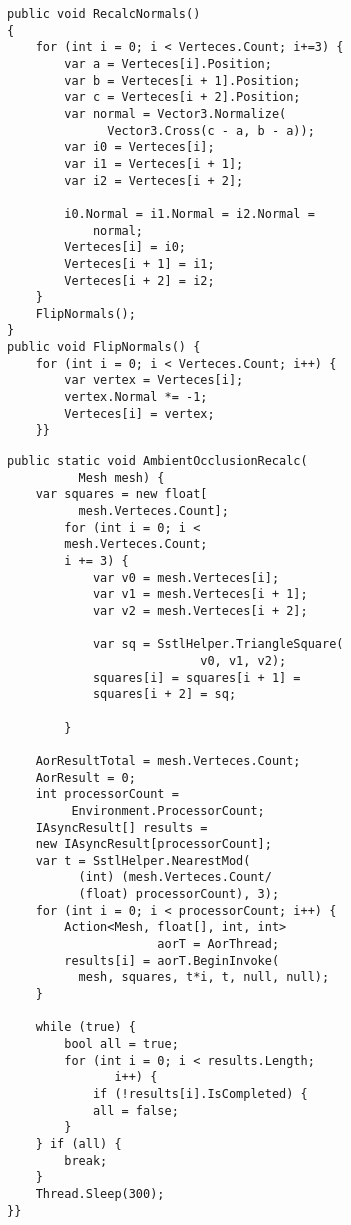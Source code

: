 \clearpage
{}
\begin{lstlisting}
public void RecalcNormals()
{
    for (int i = 0; i < Verteces.Count; i+=3) {
        var a = Verteces[i].Position;
        var b = Verteces[i + 1].Position;
        var c = Verteces[i + 2].Position;
        var normal = Vector3.Normalize(
              Vector3.Cross(c - a, b - a));
        var i0 = Verteces[i];
        var i1 = Verteces[i + 1];
        var i2 = Verteces[i + 2];

        i0.Normal = i1.Normal = i2.Normal = 
            normal;
        Verteces[i] = i0;
        Verteces[i + 1] = i1;
        Verteces[i + 2] = i2;
    }
    FlipNormals();
}
public void FlipNormals() {
    for (int i = 0; i < Verteces.Count; i++) {
        var vertex = Verteces[i];
        vertex.Normal *= -1;
        Verteces[i] = vertex;
    }}
\end{lstlisting}

\clearpage
\begin{lstlisting}
public static void AmbientOcclusionRecalc(
          Mesh mesh) {
    var squares = new float[
          mesh.Verteces.Count];
        for (int i = 0; i < 
        mesh.Verteces.Count; 
        i += 3) {
            var v0 = mesh.Verteces[i];
            var v1 = mesh.Verteces[i + 1];
            var v2 = mesh.Verteces[i + 2];

            var sq = SstlHelper.TriangleSquare(
                           v0, v1, v2);
            squares[i] = squares[i + 1] = 
            squares[i + 2] = sq;

        }

    AorResultTotal = mesh.Verteces.Count;
    AorResult = 0;
    int processorCount = 
         Environment.ProcessorCount;
    IAsyncResult[] results = 
    new IAsyncResult[processorCount];
    var t = SstlHelper.NearestMod(
          (int) (mesh.Verteces.Count/
          (float) processorCount), 3);
    for (int i = 0; i < processorCount; i++) {
        Action<Mesh, float[], int, int> 
                     aorT = AorThread;
        results[i] = aorT.BeginInvoke(
          mesh, squares, t*i, t, null, null);
    }

    while (true) {
        bool all = true;
        for (int i = 0; i < results.Length; 
               i++) {
            if (!results[i].IsCompleted) {
            all = false;
        }
    } if (all) {
        break;
    }
    Thread.Sleep(300);
}}
\end{lstlisting}

